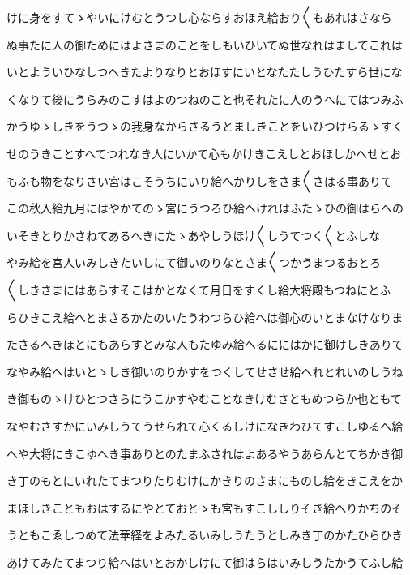 \documentclass[a4paper,11pt,landscape]{ltjtarticle}
\begin{document}
\par\medskip
けに身をすてゝやいにけむとうつし心ならすおほえ給おり〱もあれはさなら
\par\medskip
ぬ事たに人の御ためにはよさまのことをしもいひいてぬ世なれはましてこれは
\par\medskip
いとよういひなしつへきたよりなりとおほすにいとなたたしうひたすら世にな
\par\medskip
くなりて後にうらみのこすはよのつねのこと也それたに人のうへにてはつみふ
\par\medskip
かうゆゝしきをうつゝの我身なからさるうとましきことをいひつけらるゝすく
\par\medskip
せのうきことすへてつれなき人にいかて心もかけきこえしとおほしかへせとお
\par\medskip
もふも物をなりさい宮はこそうちにいり給へかりしをさま〱さはる事ありて
\par\medskip
この秋入給九月にはやかてのゝ宮にうつろひ給へけれはふたゝひの御はらへの
\par\medskip
いそきとりかさねてあるへきにたゝあやしうほけ〱しうてつく〱とふしな
\par\medskip
やみ給を宮人いみしきたいしにて御いのりなとさま〱つかうまつるおとろ
\par\medskip
〱しきさまにはあらすそこはかとなくて月日をすくし給大将殿もつねにとふ
\par\medskip
らひきこえ給へとまさるかたのいたうわつらひ給へは御心のいとまなけなりま
\par\medskip
たさるへきほとにもあらすとみな人もたゆみ給へるににはかに御けしきありて
\par\medskip
なやみ給へはいとゝしき御いのりかすをつくしてせさせ給へれとれいのしうね
\par\medskip
き御ものゝけひとつさらにうこかすやむことなきけむさともめつらか也ともて
\par\medskip
なやむさすかにいみしうてうせられて心くるしけになきわひてすこしゆるへ給
\par\medskip
へや大将にきこゆへき事ありとのたまふされはよあるやうあらんとてちかき御
\par\medskip
き丁のもとにいれたてまつりたりむけにかきりのさまにものし給をきこえをか
\par\medskip
まほしきこともおはするにやとておとゝも宮もすこししりそき給へりかちのそ
\par\medskip
うともこゑしつめて法華経をよみたるいみしうたうとしみき丁のかたひらひき
\par\medskip
あけてみたてまつり給へはいとおかしけにて御はらはいみしうたかうてふし給
\par\medskip
\end{document}
